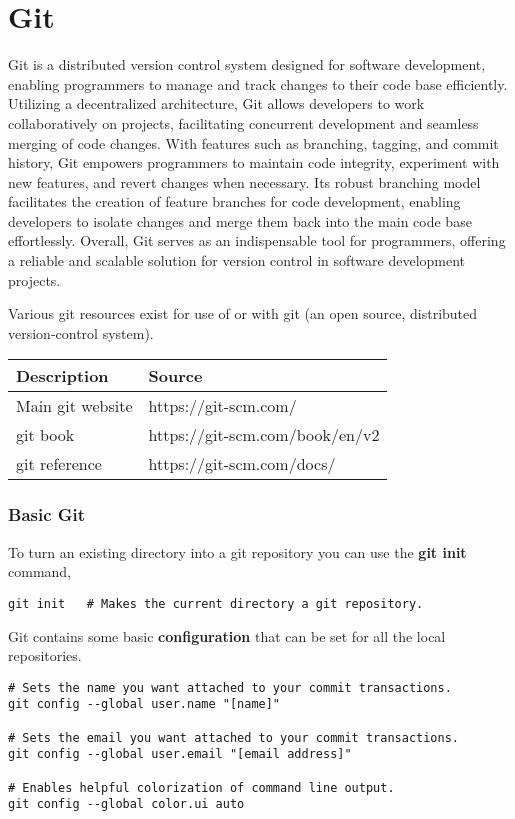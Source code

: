 \chapter{Git}
\thispagestyle{fancy}
\lstset{}\lstset{language=bash, style=gitstyle}

Git is a distributed version control system designed for software development, enabling programmers to manage and track changes to their code base efficiently. Utilizing a decentralized architecture, Git allows developers to work collaboratively on projects, facilitating concurrent development and seamless merging of code changes. With features such as branching, tagging, and commit history, Git empowers programmers to maintain code integrity, experiment with new features, and revert changes when necessary. Its robust branching model facilitates the creation of feature branches for code development, enabling developers to isolate changes and merge them back into the main code base effortlessly. Overall, Git serves as an indispensable tool for programmers, offering a reliable and scalable solution for version control in software development projects.

\begin{fancybox}{}	
	Various git resources exist for use of or with git (an open source, distributed version-control system).
	\begin{center}
		\begin{tabular}{l|l}
			Description & Source \\
			\hline
			Main git website & https://git-scm.com/ \\
			git book & https://git-scm.com/book/en/v2 \\
			git reference & https://git-scm.com/docs/
		\end{tabular}
	\end{center}
\end{fancybox}

\subsection{Basic Git}

To turn an existing directory into a git repository you can use the \textbf{git init} command,
\begin{lstlisting}
git init   # Makes the current directory a git repository.
\end{lstlisting}

Git contains some basic \textbf{configuration} that can be set for all the local repositories.
\begin{lstlisting}
# Sets the name you want attached to your commit transactions.
git config --global user.name "[name]"

# Sets the email you want attached to your commit transactions.
git config --global user.email "[email address]"

# Enables helpful colorization of command line output.
git config --global color.ui auto
\end{lstlisting}

